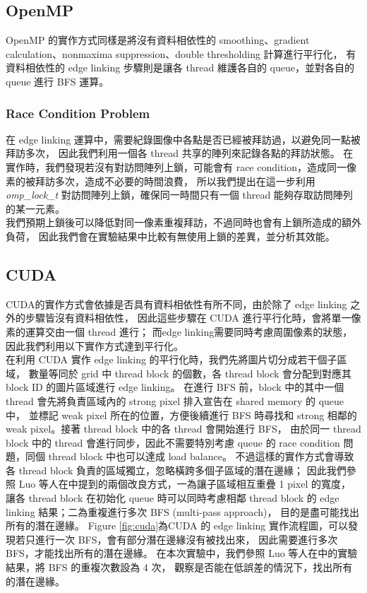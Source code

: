 \documentclass[sigconf,nonacm]{acmart}
\begin{document}
\subsection{OpenMP}

OpenMP 的實作方式同樣是將沒有資料相依性的 smoothing、gradient calculation、nonmaxima suppression、double thresholding 計算進行平行化，
有資料相依性的 edge linking 步驟則是讓各 thread 維護各自的 queue，並對各自的 queue 進行 BFS 運算。

\subsubsection{Race Condition Problem} \label{race_condition}

在 edge linking 運算中，需要紀錄圖像中各點是否已經被拜訪過，以避免同一點被拜訪多次，
因此我們利用一個各 thread 共享的陣列來記錄各點的拜訪狀態。
在實作時，我們發現若沒有對訪問陣列上鎖，可能會有 race condition，造成同一像素的被拜訪多次，造成不必要的時間浪費，
所以我們提出在這一步利用 \emph{omp\_lock\_t} 對訪問陣列上鎖，確保同一時間只有一個 thread 能夠存取訪問陣列的某一元素。 \\
我們預期上鎖後可以降低對同一像素重複拜訪，不過同時也會有上鎖所造成的額外負荷，
因此我們會在實驗結果中比較有無使用上鎖的差異，並分析其效能。

\subsection{CUDA}

CUDA的實作方式會依據是否具有資料相依性有所不同，由於除了 edge linking 之外的步驟皆沒有資料相依性，
因此這些步驟在 CUDA 進行平行化時，會將單一像素的運算交由一個 thread 進行；
而edge linking需要同時考慮周圍像素的狀態，因此我們利用以下實作方式達到平行化。 \\
在利用 CUDA 實作 edge linking 的平行化時，我們先將圖片切分成若干個子區域，
數量等同於 grid 中 thread block 的個數，各 thread block 會分配到對應其 block ID 的圖片區域進行 edge linking。
在進行 BFS 前，block 中的其中一個 thread 會先將負責區域內的 strong pixel 排入宣告在 shared memory 的 queue 中，
並標記 weak pixel 所在的位置，方便後續進行 BFS 時尋找和 strong 相鄰的 weak pixel。接著 thread block 中的各 thread 會開始進行 BFS，
由於同一 thread block 中的 thread 會進行同步，因此不需要特別考慮 queue 的 race condition 問題，同個 thread block 中也可以達成 load balance。
不過這樣的實作方式會導致各 thread block 負責的區域獨立，忽略橫跨多個子區域的潛在邊緣；
因此我們參照 Luo 等人在\cite{4563088}中提到的兩個改良方式，一為讓子區域相互重疊 1 pixel 的寬度，
讓各 thread block 在初始化 queue 時可以同時考慮相鄰 thread block 的 edge linking 結果；二為重複進行多次 BFS (multi-pass approach)，
目的是盡可能找出所有的潛在邊緣。
Figure \ref{fig:cuda}為CUDA 的 edge linking 實作流程圖，可以發現若只進行一次 BFS，會有部分潛在邊緣沒有被找出來，
因此需要進行多次 BFS，才能找出所有的潛在邊緣。
在本次實驗中，我們參照 Luo 等人在\cite{4563088}中的實驗結果，將 BFS 的重複次數設為 4 次，
觀察是否能在低誤差的情況下，找出所有的潛在邊緣。
\end{document}
